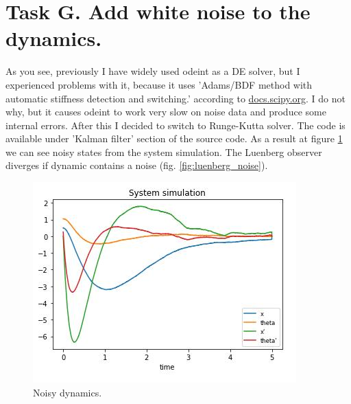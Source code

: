 \documentclass[12pt,letterpaper]{article}
\begin{document}
\section*{Task G. Add white noise to the dynamics.}
\label{Q:G}
    As you see, previously I have widely used odeint as a DE solver, but I experienced problems with it, because it uses 'Adams/BDF method with automatic stiffness detection and switching.' according to \href{https://docs.scipy.org/doc/scipy/reference/generated/scipy.integrate.LSODA.html#scipy-integrate-lsoda}{docs.scipy.org}. I do not why, but it causes odeint to work very slow on noise data and produce some internal errors. After this I decided to switch to Runge-Kutta solver. The code is available under 'Kalman filter' section of the source code. As a result at figure \ref{fig:noise_dynamics} we can see noisy states from the system simulation. The Luenberg observer diverges if dynamic contains a noise (fig. \ref{fig:luenberg_noise}).
    
    \begin{figure}[htb]
        \centering
        \includegraphics[width=0.5\linewidth]{images/filter/noisy_dynamics.jpg}
        \caption{Noisy dynamics.}
        \label{fig:noise_dynamics}
    \end{figure}
    
\end{document}
